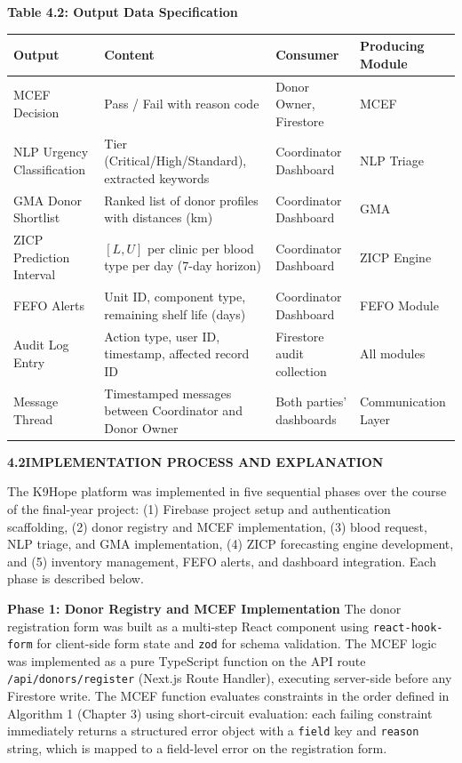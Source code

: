 \documentclass[12pt,a4paper]{article}
\begin{document}
\begin{center}
\textbf{Table 4.2: Output Data Specification}
\vspace{0.4em}
\begin{tabular}{p{3.5cm} p{4.2cm} p{2.5cm} p{3cm}}
\toprule
\textbf{Output} & \textbf{Content} & \textbf{Consumer} & \textbf{Producing Module} \\
\midrule
MCEF Decision & Pass / Fail with reason code & Donor Owner, Firestore & MCEF \\
\addlinespace
NLP Urgency Classification & Tier (Critical/High/Standard), extracted keywords & Coordinator Dashboard & NLP Triage \\
\addlinespace
GMA Donor Shortlist & Ranked list of donor profiles with distances (km) & Coordinator Dashboard & GMA \\
\addlinespace
ZICP Prediction Interval & $[L, U]$ per clinic per blood type per day (7-day horizon) & Coordinator Dashboard & ZICP Engine \\
\addlinespace
FEFO Alerts & Unit ID, component type, remaining shelf life (days) & Coordinator Dashboard & FEFO Module \\
\addlinespace
Audit Log Entry & Action type, user ID, timestamp, affected record ID & Firestore audit collection & All modules \\
\addlinespace
Message Thread & Timestamped messages between Coordinator and Donor Owner & Both parties' dashboards & Communication Layer \\
\bottomrule
\end{tabular}
\end{center}

\vspace{1.5em}
\noindent\textbf{4.2\quad IMPLEMENTATION PROCESS AND EXPLANATION}
\vspace{0.6em}

\noindent The K9Hope platform was implemented in five sequential phases over the course of the final-year project: (1) Firebase project setup and authentication scaffolding, (2) donor registry and MCEF implementation, (3) blood request, NLP triage, and GMA implementation, (4) ZICP forecasting engine development, and (5) inventory management, FEFO alerts, and dashboard integration. Each phase is described below.

\noindent\textbf{Phase 1: Donor Registry and MCEF Implementation}
\noindent The donor registration form was built as a multi-step React component using \texttt{react-hook-form} for client-side form state and \texttt{zod} for schema validation. The MCEF logic was implemented as a pure TypeScript function on the API route \texttt{/api/donors/register} (Next.js Route Handler), executing server-side before any Firestore write. The MCEF function evaluates constraints in the order defined in Algorithm 1 (Chapter 3) using short-circuit evaluation: each failing constraint immediately returns a structured error object with a \texttt{field} key and \texttt{reason} string, which is mapped to a field-level error on the registration form.
\end{document}

